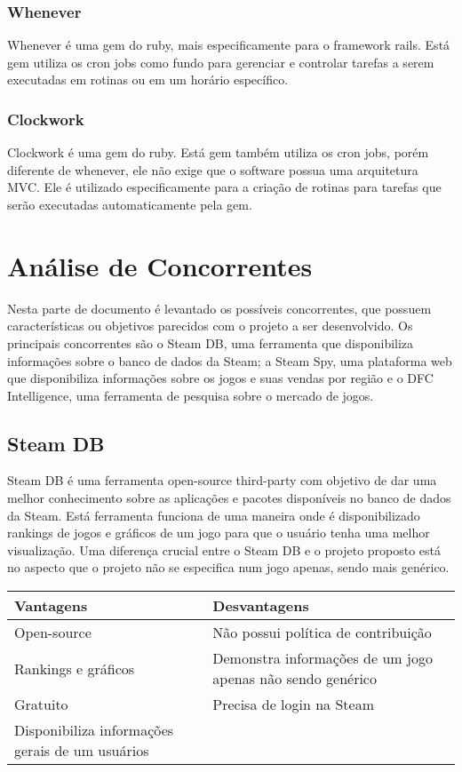 \subsubsection*{Whenever}
Whenever é uma gem do ruby, mais especificamente para o framework rails. Está gem utiliza os cron jobs como fundo para gerenciar e controlar tarefas a serem executadas em rotinas ou em um horário específico\cite{whenever}.
\subsubsection*{Clockwork}
Clockwork é uma gem do ruby. Está gem também utiliza os cron jobs, porém diferente de whenever, ele não exige que o software possua uma arquitetura MVC. Ele é utilizado especificamente para a criação de rotinas para tarefas que serão executadas automaticamente pela gem\cite{clockwork}.
\section*{Análise de Concorrentes}
Nesta parte de documento é levantado os possíveis concorrentes, que possuem características ou objetivos parecidos com o projeto a ser desenvolvido. Os principais concorrentes são o Steam DB, uma ferramenta que disponibiliza informações sobre o banco de dados da Steam; a Steam Spy, uma plataforma web que disponibiliza informações sobre os jogos e suas vendas por região e o DFC Intelligence, uma ferramenta de pesquisa sobre o mercado de jogos.
\subsection*{Steam DB}
Steam DB é uma ferramenta open-source third-party com objetivo de dar uma melhor conhecimento sobre as aplicações e pacotes disponíveis no banco de dados da Steam\cite{steam_db}. Está ferramenta funciona de uma maneira onde é disponibilizado rankings de jogos e gráficos de um jogo para que o usuário tenha uma melhor visualização. Uma diferença crucial entre o Steam DB e o projeto proposto está no aspecto que o projeto não se especifica num jogo apenas, sendo mais genérico.
\begin{center}
\begin{tabular}{|p{7cm}|p{7cm}|}
\hline \textbf{Vantagens} & \textbf{Desvantagens}
\\
\hline Open-source & Não possui política de contribuição
\\
\hline Rankings e gráficos & Demonstra informações de um jogo apenas não sendo genérico
\\
\hline Gratuito & Precisa de login na Steam
\\
\hline Disponibiliza informações gerais de um usuários &
\\
\hline
\end{tabular}
\end{center}
